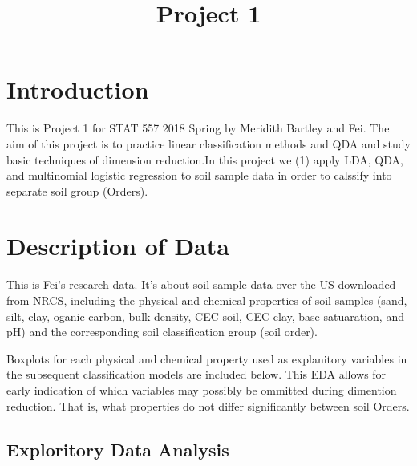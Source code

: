 \documentclass[]{article}
\title{Project 1}
\author{}
\date{}
\begin{document}
\maketitle

\section{Introduction}\label{introduction}

This is Project 1 for STAT 557 2018 Spring by Meridith Bartley and Fei.
The aim of this project is to practice linear classification methods and
QDA and study basic techniques of dimension reduction.In this project we
(1) apply LDA, QDA, and multinomial logistic regression to soil sample
data in order to calssify into separate soil group (Orders).

\section{Description of Data}\label{description-of-data}

This is Fei's research data. It's about soil sample data over the US
downloaded from NRCS, including the physical and chemical properties of
soil samples (sand, silt, clay, oganic carbon, bulk density, CEC soil,
CEC clay, base satuaration, and pH) and the corresponding soil
classification group (soil order).

Boxplots for each physical and chemical property used as explanitory
variables in the subsequent classification models are included below.
This EDA allows for early indication of which variables may possibly be
ommitted during dimention reduction. That is, what properties do not
differ significantly between soil Orders.

\subsection{Exploritory Data Analysis}\label{exploritory-data-analysis}
\end{document}
